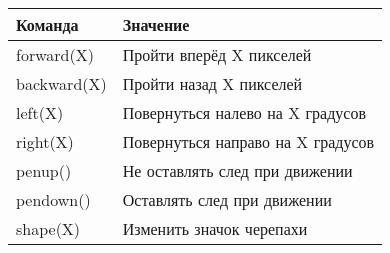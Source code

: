 \begin{longtable}[c]{@{}ll@{}}
\toprule
\begin{minipage}[b]{0.18\columnwidth}\raggedright\strut
Команда
\strut\end{minipage} &
\begin{minipage}[b]{0.47\columnwidth}\raggedright\strut
Значение
\strut\end{minipage}\tabularnewline
\midrule
\endhead
\begin{minipage}[t]{0.18\columnwidth}\raggedright\strut
forward(X)
\strut\end{minipage} &
\begin{minipage}[t]{0.47\columnwidth}\raggedright\strut
Пройти вперёд X пикселей
\strut\end{minipage}\tabularnewline
\begin{minipage}[t]{0.18\columnwidth}\raggedright\strut
backward(X)
\strut\end{minipage} &
\begin{minipage}[t]{0.47\columnwidth}\raggedright\strut
Пройти назад X пикселей
\strut\end{minipage}\tabularnewline
\begin{minipage}[t]{0.18\columnwidth}\raggedright\strut
left(X)
\strut\end{minipage} &
\begin{minipage}[t]{0.47\columnwidth}\raggedright\strut
Повернуться налево на X градусов
\strut\end{minipage}\tabularnewline
\begin{minipage}[t]{0.18\columnwidth}\raggedright\strut
right(X)
\strut\end{minipage} &
\begin{minipage}[t]{0.47\columnwidth}\raggedright\strut
Повернуться направо на X градусов
\strut\end{minipage}\tabularnewline
\begin{minipage}[t]{0.18\columnwidth}\raggedright\strut
penup()
\strut\end{minipage} &
\begin{minipage}[t]{0.47\columnwidth}\raggedright\strut
Не оставлять след при движении
\strut\end{minipage}\tabularnewline
\begin{minipage}[t]{0.18\columnwidth}\raggedright\strut
pendown()
\strut\end{minipage} &
\begin{minipage}[t]{0.47\columnwidth}\raggedright\strut
Оставлять след при движении
\strut\end{minipage}\tabularnewline
\begin{minipage}[t]{0.18\columnwidth}\raggedright\strut
shape(X)
\strut\end{minipage} &
\begin{minipage}[t]{0.47\columnwidth}\raggedright\strut
Изменить значок черепахи
\strut\end{minipage}\tabularnewline
\bottomrule
\end{longtable}

